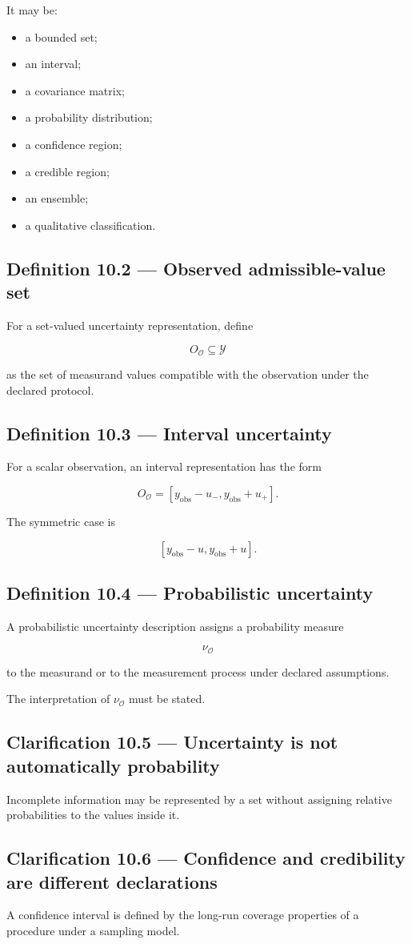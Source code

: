\documentclass[11pt,oneside,openany]{book}
\newcommand{\PCsubsection}[1]{%
  \subsection*{#1}%
}
\begin{document}
It may be:

\begin{itemize}
\item a bounded set;
\item an interval;
\item a covariance matrix;
\item a probability distribution;
\item a confidence region;
\item a credible region;
\item an ensemble;
\item a qualitative classification.
\end{itemize}
\PCsubsection{Definition 10.2 --- Observed admissible-value set}

For a set-valued uncertainty representation, define

\[
\boxed{ O_{\mathcal O} \subseteq \mathcal Y }
\]

as the set of measurand values compatible with the observation under the declared protocol.

\PCsubsection{Definition 10.3 --- Interval uncertainty}

For a scalar observation, an interval representation has the form

\[
\boxed{ O_{\mathcal O} = [y_{\mathrm{obs}}-u_{-}, y_{\mathrm{obs}}+u_{+}]. }
\]

The symmetric case is

\[
[y_{\mathrm{obs}}-u, y_{\mathrm{obs}}+u].
\]

\PCsubsection{Definition 10.4 --- Probabilistic uncertainty}

A probabilistic uncertainty description assigns a probability measure

\[
\boxed{ \nu_{\mathcal O} }
\]

to the measurand or to the measurement process under declared assumptions.

The interpretation of \(\nu_{\mathcal O}\) must be stated.

\PCsubsection{Clarification 10.5 --- Uncertainty is not automatically probability}

Incomplete information may be represented by a set without assigning relative probabilities to the values inside it.

\PCsubsection{Clarification 10.6 --- Confidence and credibility are different declarations}

A confidence interval is defined by the long-run coverage properties of a procedure under a sampling model.
\end{document}
